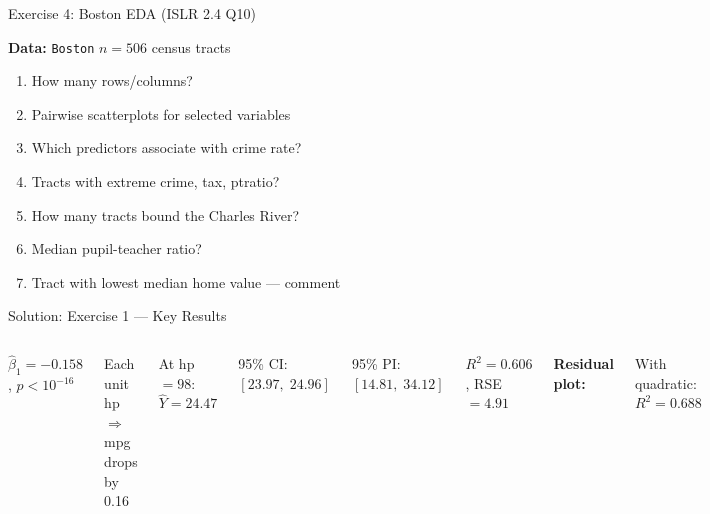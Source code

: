 \documentclass[aspectratio=169, 11pt]{beamer}
\begin{document}
\begin{frame}{Exercise 4: Boston EDA (ISLR 2.4 Q10)}

\textbf{Data:} \texttt{Boston} \hfill $n = 506$ census tracts

\vspace{0.5em}
\begin{enumerate}
  \item How many rows/columns?
  \item Pairwise scatterplots for selected variables
  \item Which predictors associate with crime rate?
  \item Tracts with extreme crime, tax, ptratio?
  \item How many tracts bound the Charles River?
  \item Median pupil-teacher ratio?
  \item Tract with lowest median home value --- comment
\end{enumerate}

\vspace{0.5em}
\end{frame}


\begin{frame}{Solution: Exercise 1 --- Key Results}
\begin{columns}
$\hat{\beta}_1 = -0.158$, $p < 10^{-16}$

\vspace{0.2em}
Each unit hp $\Rightarrow$ mpg drops by 0.16

\vspace{0.2em}
At hp $= 98$: $\hat{Y} = 24.47$

\vspace{0.2em}
95\% CI: $[23.97, \; 24.96]$

95\% PI: $[14.81, \; 34.12]$

\vspace{0.3em}
$R^2 = 0.606$, RSE $= 4.91$

\textbf{Residual plot:}


\vspace{0.2em}
With quadratic: $R^2 = 0.688$
\end{columns}
\end{frame}
\end{document}
